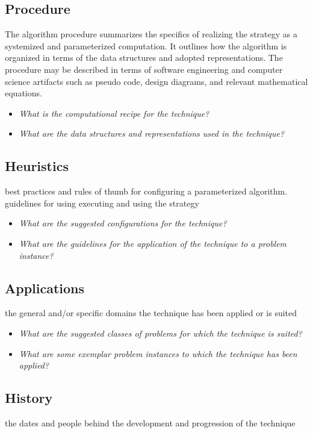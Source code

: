 \documentclass[a4paper, 11pt]{article}
\begin{document}
\subsection{Procedure}
The algorithm procedure summarizes the specifics of realizing the strategy as a systemized and parameterized computation. It outlines how the algorithm is organized in terms of the data structures and adopted representations. The procedure may be described in terms of software engineering and computer science artifacts such as pseudo code, design diagrams, and relevant mathematical equations.

\begin{itemize}
	\item \emph{What is the computational recipe for the technique?}
	\item \emph{What are the data structures and representations used in the technique?}
\end{itemize}

\subsection{Heuristics}
best practices and rules of thumb for configuring a parameterized algorithm. guidelines for using executing and using the strategy

\begin{itemize}
	\item \emph{What are the suggested configurations for the technique?}
	\item \emph{What are the guidelines for the application of the technique to a problem instance?}
\end{itemize}

\subsection{Applications}
the general and/or specific domains the technique has been applied or is suited

\begin{itemize}
	\item \emph{What are the suggested classes of problems for which the technique is suited?}
	\item \emph{What are some exemplar problem instances to which the technique has been applied?}
\end{itemize}

\subsection{History}
the dates and people behind the development and progression of the technique
\end{document}
